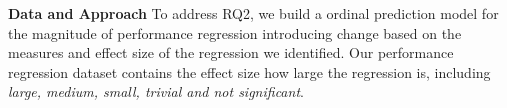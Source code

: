 


\noindent \textbf{Data and Approach}
To address RQ2, we build a ordinal prediction model for the magnitude of performance regression introducing change based on the measures and effect size of the regression we identified. Our performance regression dataset contains the effect size how large the regression is, including \emph{large, medium, small, trivial and not significant}.



